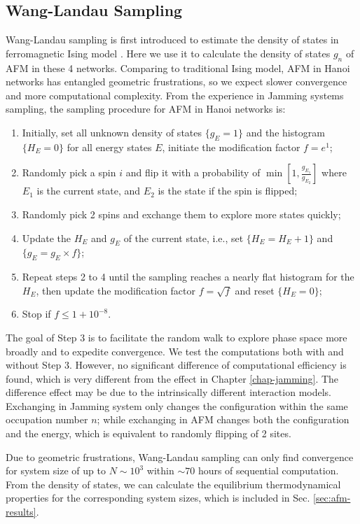 \subsection{Wang-Landau Sampling}
Wang-Landau sampling is first introduced to estimate the density of states in ferromagnetic Ising model \cite{Wang2001}. Here we use it to calculate the density of states $g_{n}$ of AFM in
these 4 networks. Comparing to traditional Ising model, AFM in Hanoi networks has entangled geometric frustrations, so we expect slower convergence and more computational complexity. From the experience in Jamming systems sampling, the sampling procedure for AFM in Hanoi networks is: 
\begin{enumerate}
\item Initially, set all unknown density of states $\{g_{E}=1\}$ and the
histogram $\{H_{E}=0\}$ for all energy states $E$, initiate the modification
factor $f=e^1$; 
\item Randomly pick a spin $i$ and flip it with a probability of $\min\left[1,\frac{g_{E_1}}{g_{E_2}}\right]$ where $E_1$ is the current state, and $E_2$ is the state if the spin is flipped;
\item Randomly pick 2 spins and exchange them to explore more states quickly; 
\item Update the $H_{E}$ and $g_{E}$ of the current state, i.e., set $\{H_{E}=H_{E}+1\}$
and $\{g_{E}=g_{E}\times f\}$; 
\item Repeat steps 2 to 4 until the sampling reaches a nearly flat histogram
for the $H_{E}$, then update the modification factor $f=\sqrt{f}$
and reset $\{H_{E}=0\}$; 
\item Stop if $f\le1+10^{-8}$. 
\end{enumerate}

The goal of Step 3 is to facilitate the random walk to explore phase space more broadly and to expedite convergence. We test the computations both with and without Step 3. However, no significant difference of computational efficiency is found, which is very different from the effect in Chapter \ref{chap-jamming}. The difference effect may be due to the intrinsically different interaction models. Exchanging in Jamming system only changes the configuration within the same occupation number $n$; while exchanging in AFM changes both the configuration and the energy, which is equivalent to randomly flipping of 2 sites.  

Due to geometric frustrations, Wang-Landau sampling can only find convergence for system size of up to $N\sim10^{3}$ within $\sim70$ hours of sequential computation. From the density of states, we can calculate the equilibrium thermodynamical properties for the corresponding system sizes, which is included in Sec. \ref{sec:afm-results}. 


